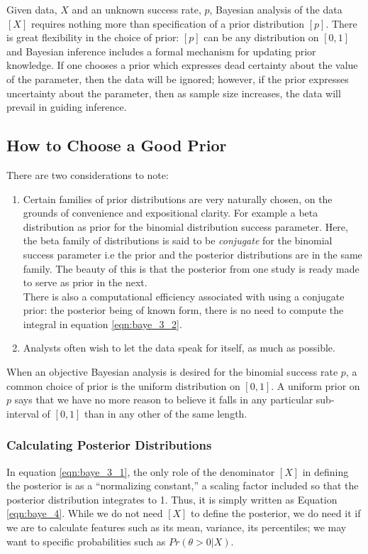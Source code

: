 \documentclass[12pt,oneside,a4paper]{book}
\theoremstyle{definition}
\theoremstyle{remark}
\begin{document}
				Given data, $X$ and an unknown success rate, $p$, Bayesian analysis of the data $[X]$ requires nothing more than specification of a prior distribution $[p]$. There is great flexibility in the choice of prior: $[p]$ can be any distribution on $[0, 1]$ and  Bayesian inference includes a formal mechanism for updating prior knowledge. If one chooses a prior which expresses dead certainty about the value of the parameter, then the data will be ignored; however, if the prior expresses uncertainty about the parameter, then as sample size increases, the data will prevail in guiding inference.

				\subsection{How to Choose a Good Prior}
				There are two considerations to note:
				\begin{enumerate}
					\item[(i.)] Certain families of prior distributions are very naturally chosen, on the grounds of convenience and expositional clarity. For example a beta distribution as prior for the binomial distribution success parameter. Here, the beta family of distributions is said to be \textit{conjugate} for the binomial success parameter i.e the prior and the posterior distributions are in the same family. The beauty of this is 		that the posterior from one study is ready made to serve as prior in the next.\\
					There is also a computational efficiency associated with using a conjugate prior: the posterior being of known form, there is no need to compute the integral in equation \eqref{eqn:baye_3_2}.

					\item[(ii.)] Analysts often wish to let the data speak for itself, as much as possible.
				\end{enumerate}

				When an objective Bayesian analysis is desired for the binomial success rate $p$, a common choice of prior is the uniform distribution on $[0, 1]$. A uniform prior on $p$ says that we have no more reason to believe it falls in any particular sub-interval of $[0, 1]$ than in any other of the same length\cite{link2009bayesian}.

			\subsubsection{Calculating Posterior Distributions}
				In equation \eqref{eqn:baye_3_1}, the only role of the denominator $[X]$ in defining the posterior is as a “normalizing constant,” a scaling factor included so that the posterior distribution integrates to 1. Thus, it is simply written as Equation \eqref{eqn:baye_4}. While we do not need $[X]$ to define the posterior, we do need it if we are to calculate features such as its mean, variance, its percentiles; we may want to specific probabilities such as $Pr(\theta >0|X)$.
\end{document}
